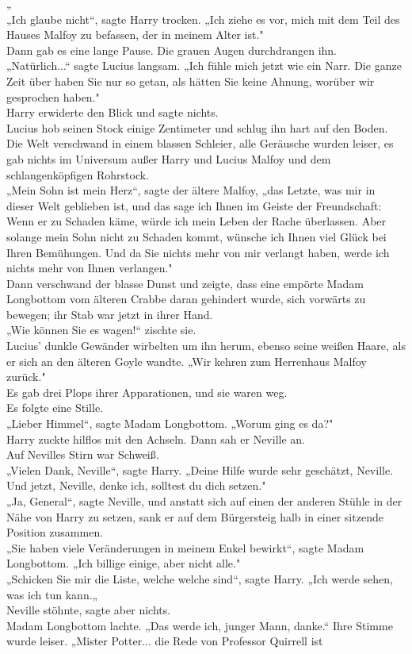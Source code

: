{„\\ „Ich glaube nicht“, sagte Harry trocken. „Ich ziehe es vor, mich mit dem Teil des Hauses Malfoy zu befassen, der in meinem Alter ist."\\ Dann gab es eine lange Pause. Die grauen Augen durchdrangen ihn.\\ „Natürlich...“ sagte Lucius langsam. „Ich fühle mich jetzt wie ein Narr. Die ganze Zeit über haben Sie nur so getan, als hätten Sie keine Ahnung, worüber wir gesprochen haben."\\ Harry erwiderte den Blick und sagte nichts.\\ Lucius hob seinen Stock einige Zentimeter und schlug ihn hart auf den Boden.\\ Die Welt verschwand in einem blassen Schleier, alle Geräusche wurden leiser, es gab nichts im Universum außer Harry und Lucius Malfoy und dem schlangenköpfigen Rohrstock.\\ „Mein Sohn ist mein Herz“, sagte der ältere Malfoy, „das Letzte, was mir in dieser Welt geblieben ist, und das sage ich Ihnen im Geiste der Freundschaft: Wenn er zu Schaden käme, würde ich mein Leben der Rache überlassen. Aber solange mein Sohn nicht zu Schaden kommt, wünsche ich Ihnen viel Glück bei Ihren Bemühungen. Und da Sie nichts mehr von mir verlangt haben, werde ich nichts mehr von Ihnen verlangen."\\ Dann verschwand der blasse Dunst und zeigte, dass eine empörte Madam Longbottom vom älteren Crabbe daran gehindert wurde, sich vorwärts zu bewegen; ihr Stab war jetzt in ihrer Hand.\\ „Wie können Sie es wagen!“ zischte sie.\\ Lucius' dunkle Gewänder wirbelten um ihn herum, ebenso seine weißen Haare, als er sich an den älteren Goyle wandte. „Wir kehren zum Herrenhaus Malfoy zurück."\\ Es gab drei Plops ihrer Apparationen, und sie waren weg.\\ Es folgte eine Stille.\\ „Lieber Himmel“, sagte Madam Longbottom. „Worum ging es da?"\\ Harry zuckte hilflos mit den Achseln. Dann sah er Neville an.\\ Auf Nevilles Stirn war Schweiß.\\ „Vielen Dank, Neville“, sagte Harry. „Deine Hilfe wurde sehr geschätzt, Neville. Und jetzt, Neville, denke ich, solltest du dich setzen."\\ „Ja, General“, sagte Neville, und anstatt sich auf einen der anderen Stühle in der Nähe von Harry zu setzen, sank er auf dem Bürgersteig halb in einer sitzende Position zusammen.\\ „Sie haben viele Veränderungen in meinem Enkel bewirkt“, sagte Madam Longbottom. „Ich billige einige, aber nicht alle."\\ „Schicken Sie mir die Liste, welche welche sind“, sagte Harry. „Ich werde sehen, was ich tun kann.„\\ Neville stöhnte, sagte aber nichts.\\ Madam Longbottom lachte. „Das werde ich, junger Mann, danke.“ Ihre Stimme wurde leiser. „Mister Potter... die Rede von Professor Quirrell ist }
